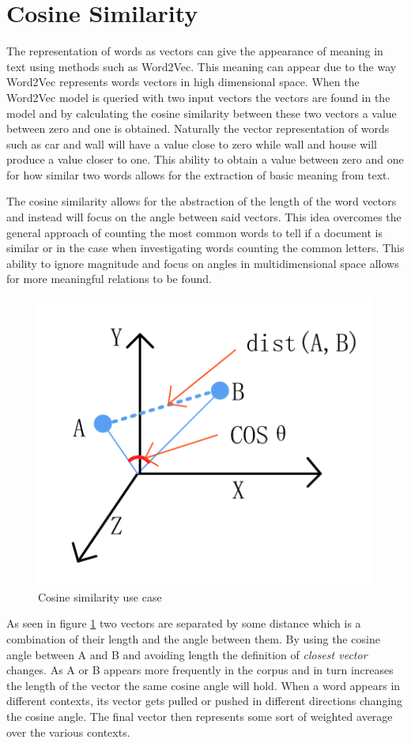 \section{Cosine Similarity}
 The representation of words as vectors can give the appearance of meaning in text using methods such as Word2Vec. This meaning can appear due to the way Word2Vec represents words vectors in high dimensional space. When the Word2Vec model is queried with two input vectors the vectors are found in the model and by calculating the cosine similarity between these two vectors a value between zero and one is obtained. Naturally the vector representation of words such as car and wall will have a value close to zero while wall and house will produce a value closer to one. This ability to obtain a value between zero and one for how similar two words allows for the extraction of basic meaning from text. 
 
 The cosine similarity allows for the abstraction of the length of the word vectors and instead will focus on the angle between said vectors. This idea overcomes the general approach of counting the most common words to tell if a document is similar or in the case when investigating words counting the common letters. This ability to ignore magnitude and focus on angles in multidimensional space allows for more meaningful relations to be found.
 
 \begin{figure}[h]
    \centering
    \includegraphics[width=.55\textwidth]{images/cosine_sim.png}
    \caption{Cosine similarity use case}
    \label{fig:cosine_vectors}
\end{figure}

\noindent
As seen in figure \ref{fig:cosine_vectors} \cite{Wang1} two vectors are separated by some distance which is a combination of their length and the angle between them. By using the cosine angle between A and B and avoiding length the definition of \textit{closest vector} changes. As A or B appears more frequently in the corpus and in turn increases the length of the vector the same cosine angle will hold. When a word appears in different contexts, its vector gets pulled or pushed in different directions changing the cosine angle. The final vector then represents some sort of weighted average over the various contexts. 

